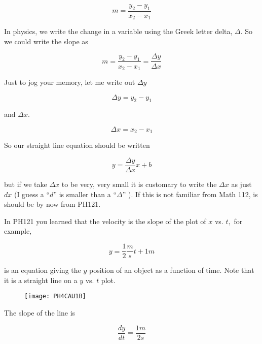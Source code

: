 \begin{equation*}
	m=\frac{y_{2}-y_{1}}{x_{2}-x_{1}}
\end{equation*}

In physics, we write the change in a variable using the Greek letter delta, $\Delta .$ So we could write the slope as

\begin{equation*}
	m=\frac{y_{2}-y_{1}}{x_{2}-x_{1}}=\frac{\Delta y}{\Delta x}
\end{equation*}

Just to jog your memory, let me write out $\Delta y$

\begin{equation*}
	\Delta y=y_{2}-y_{1}
\end{equation*}

and $\Delta x.$ 

\begin{equation*}
	\Delta x=x_{2}-x_{1}
\end{equation*}

So our straight line equation should be written 

\begin{equation*}
	y=\frac{\Delta y}{\Delta x}x+b
\end{equation*}

but if we take $\Delta x$ to be very, very small it is customary to write the $\Delta x$ as just $dx$ (I guess a ``$d$'' is smaller than a ``$\Delta $'' ). If this is not familiar from Math 112, is should be by now from PH121.

In PH121 you learned that the velocity is the slope of the plot of $x$ vs. $t,$ for example, 

\begin{equation*}
	y=\frac{1}{2}\frac{\unit{m}}{\unit{s}}t+1\unit{m}
\end{equation*}

is an equation giving the $y$ position of an object as a function of time. Note that it is a straight line on a $y$ vs. $t$ plot. 

\begin{figure}[h!]
	\centering
    \texttt{[image: PH4CAU1B]}
\end{figure}

The slope of the line is 

\begin{equation*}
	\frac{dy}{dt}=\frac{1\unit{m}}{2\unit{s}}
\end{equation*}

